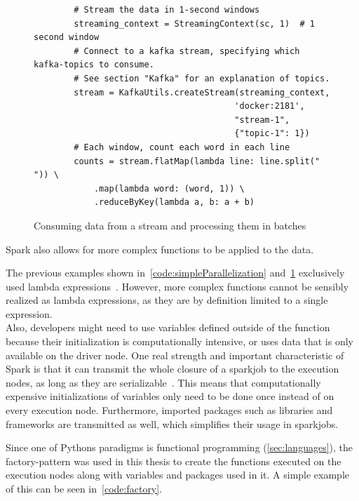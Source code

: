 \begin{figure}
    \caption{Consuming data from a stream and processing them in batches}
    \label{code:wordcount}
    \begin{verbatim}
        # Stream the data in 1-second windows
        streaming_context = StreamingContext(sc, 1)  # 1 second window
        # Connect to a kafka stream, specifying which kafka-topics to consume.
        # See section "Kafka" for an explanation of topics.
        stream = KafkaUtils.createStream(streaming_context,
                                        'docker:2181',
                                        "stream-1",
                                        {"topic-1": 1})
        # Each window, count each word in each line
        counts = stream.flatMap(lambda line: line.split(" ")) \
            .map(lambda word: (word, 1)) \
            .reduceByKey(lambda a, b: a + b)
    \end{verbatim}
\end{figure}

Spark also allows for more complex functions to be applied to the data.

The previous examples shown in~\cref{code:simpleParallelization} and~\cref{code:wordcount} exclusively used lambda expressions~\cite{pythonDocs}.
However, more complex functions cannot be sensibly realized as lambda expressions, as they are by definition limited to a single expression.
\\
Also, developers might need to use variables defined outside of the function because their initialization is computationally intensive,
or uses data that is only available on the driver node.
One real strength and important characteristic of Spark is that it can transmit the whole closure of a sparkjob to the execution nodes,
as long as they are serializable~\cite{sparkDocs}.
This means that computationally expensive initializations of variables only need to be done once instead of on every execution node.
Furthermore, imported packages such as libraries and frameworks are transmitted as well, which simplifies their usage in sparkjobs.

Since one of Pythons paradigms is functional programming (\cref{sec:languages}),
the factory-pattern was used in this thesis to create the functions executed on the execution nodes along with variables and packages used in it.
A simple example of this can be seen in~\cref{code:factory}.

